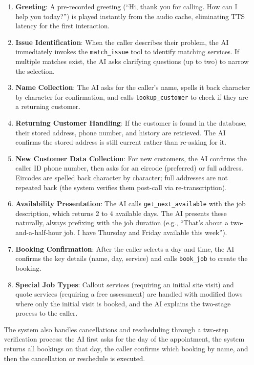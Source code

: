 \documentclass[conference]{IEEEtran}
\begin{document}
\begin{enumerate}
\item \textbf{Greeting}: A pre-recorded greeting (``Hi, thank you for calling. How can I help you today?'') is played instantly from the audio cache, eliminating TTS latency for the first interaction.
\item \textbf{Issue Identification}: When the caller describes their problem, the AI immediately invokes the \texttt{match\_issue} tool to identify matching services. If multiple matches exist, the AI asks clarifying questions (up to two) to narrow the selection.
\item \textbf{Name Collection}: The AI asks for the caller's name, spells it back character by character for confirmation, and calls \texttt{lookup\_customer} to check if they are a returning customer.
\item \textbf{Returning Customer Handling}: If the customer is found in the database, their stored address, phone number, and history are retrieved. The AI confirms the stored address is still current rather than re-asking for it.
\item \textbf{New Customer Data Collection}: For new customers, the AI confirms the caller ID phone number, then asks for an eircode (preferred) or full address. Eircodes are spelled back character by character; full addresses are not repeated back (the system verifies them post-call via re-transcription).
\item \textbf{Availability Presentation}: The AI calls \texttt{get\_next\_available} with the job description, which returns 2 to 4 available days. The AI presents these naturally, always prefixing with the job duration (e.g., ``That's about a two-and-a-half-hour job. I have Thursday and Friday available this week'').
\item \textbf{Booking Confirmation}: After the caller selects a day and time, the AI confirms the key details (name, day, service) and calls \texttt{book\_job} to create the booking.
\item \textbf{Special Job Types}: Callout services (requiring an initial site visit) and quote services (requiring a free assessment) are handled with modified flows where only the initial visit is booked, and the AI explains the two-stage process to the caller.
\end{enumerate}

The system also handles cancellations and rescheduling through a two-step verification process: the AI first asks for the day of the appointment, the system returns all bookings on that day, the caller confirms which booking by name, and then the cancellation or reschedule is executed.
\end{document}
